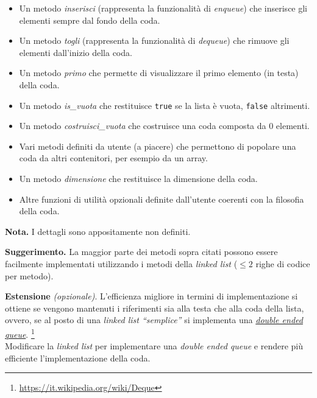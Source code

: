 \documentclass[addpoints,12pt,answers]{exam}
\begin{document}
    \begin{itemize}
        \item Un metodo \emph{inserisci} (rappresenta la funzionalità di
          \emph{enqueue}) che inserisce gli elementi sempre dal fondo
          della coda.
        \item Un metodo \emph{togli} (rappresenta la funzionalità di
          \emph{dequeue}) che rimuove gli elementi dall'inizio della
          coda.
        \item Un metodo \emph{primo} che permette di visualizzare il
          primo elemento (in testa) della coda.
        \item Un metodo \emph{is\_vuota} che restituisce \texttt{true}
          se la lista è vuota, \texttt{false} altrimenti.
        \item Un metodo \emph{costruisci\_vuota} che costruisce una coda
          composta da $0$ elementi.
        \item Vari metodi definiti da utente (a piacere) che
          permettono di popolare una coda da altri contenitori, per
          esempio da un array.
        \item Un metodo \emph{dimensione} che restituisce la dimensione
          della coda.
        \item Altre funzioni di utilità opzionali definite 
          dall'utente coerenti con la filosofia della coda.
    \end{itemize}

    \noindent\textbf{Nota.} I dettagli sono appositamente non definiti.
    
    \vspace{1em}\noindent\textbf{Suggerimento.} La maggior parte dei metodi sopra
    citati possono essere facilmente implementati utilizzando i metodi
    della \emph{linked list} ($\leq 2$ righe di codice per
    metodo).

    \vspace{1em}\noindent\textbf{Estensione} \emph{(opzionale)}.  L'efficienza
    migliore in termini di implementazione si ottiene se vengono
    mantenuti i riferimenti sia alla testa che alla coda della lista,
    ovvero, se al posto di una \emph{linked list ``semplice''} si
    implementa una
    \emph{\href{https://it.wikipedia.org/wiki/Deque}{double ended
        queue}}.
    \footnote{\href{https://it.wikipedia.org/wiki/Deque}{https://it.wikipedia.org/wiki/Deque}} \\
    Modificare la \emph{linked list} per implementare una
    \emph{double ended queue} e rendere più efficiente
    l'implementazione della coda.
\end{document}
